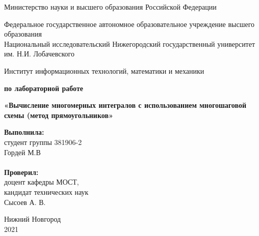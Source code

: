 \documentclass{report}
\begin{document}
\begin{titlepage}

\begin{center}
Министерство науки и высшего образования Российской Федерации
\end{center}

\begin{center}
Федеральное государственное автономное образовательное учреждение высшего образования \\
Национальный исследовательский Нижегородский государственный университет им. Н.И. Лобачевского
\end{center}

\begin{center}
Институт информационных технологий, математики и механики
\end{center}

\vspace{4em}

\begin{center}
\textbf{ по лабораторной работе} \\
\end{center}
\begin{center}
\textbf{\Large«Вычисление многомерных интегралов с использованием многошаговой схемы (метод прямоугольников»} \\
\end{center}

\vspace{4em}

\newbox{\lbox}
\newlength{\maxl}
\setlength{\maxl}{\wd\lbox}
\hfill\parbox{7cm}{
\hspace*{5cm}\hspace*{-5cm}\textbf{Выполнила:} \\ студент группы 381906-2 \\ Гордей М.В\\
\\
\hspace*{5cm}\hspace*{-5cm}\textbf{Проверил:}\\ доцент кафедры МОСТ, \\ кандидат технических наук \\ Сысоев А. В.\\
}
\vspace{\fill}

\begin{center} Нижний Новгород \\ 2021 \end{center}

\end{titlepage}
\end{document}
